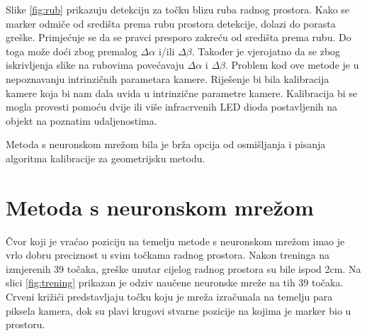 \documentclass[times, utf8, diplomski]{fer}
\begin{document}
Slike \ref{fig:rub} prikazuju detekciju za točku blizu ruba radnog prostora. Kako se marker odmiče od središta prema rubu prostora detekcije, dolazi do porasta greške. Primjećuje se da se pravci presporo zakreću od središta prema rubu. Do toga može doći zbog premalog $\Delta\alpha$ i/ili $\Delta\beta$. Također je vjerojatno da se zbog iskrivljenja slike na rubovima povećavaju $\Delta\alpha$ i $\Delta\beta$. Problem kod ove metode je u nepoznavanju intrinzičnih parametara kamere. Riješenje bi bila kalibracija kamere koja bi nam dala uvida u intrinzične parametre kamere. Kalibracija bi se mogla provesti pomoću dvije ili više infracrvenih LED dioda postavljenih na objekt na poznatim udaljenostima.

Metoda s neuronskom mrežom bila je brža opcija od osmišljanja i pisanja algoritma kalibracije za geometrijsku metodu.

\section{Metoda s neuronskom mrežom}
Čvor koji je vraćao poziciju na temelju metode s neuronskom mrežom imao je vrlo dobru preciznost u svim točkama radnog prostora. Nakon treninga na izmjerenih 39 točaka, greške unutar cijelog radnog prostora su bile ispod 2cm. Na slici \ref{fig:trening} prikazan je odziv naučene neuronske mreže na tih 39 točaka. Crveni križići predstavljaju točku koju je mreža izračunala na temelju para piksela kamera, dok su plavi krugovi stvarne pozicije na kojima je marker bio u prostoru.
\end{document}
